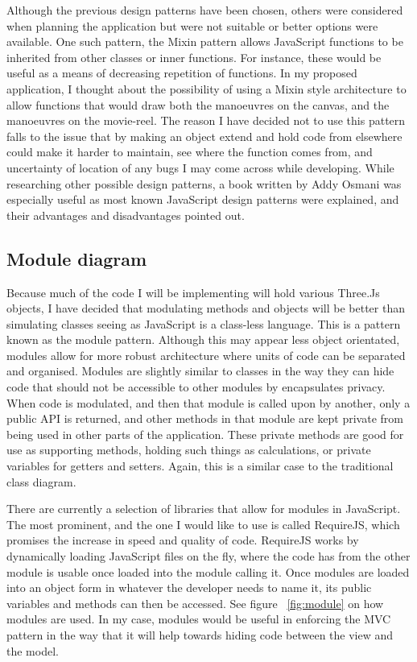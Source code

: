 Although the previous design patterns have been chosen, others were considered when planning the application but were not suitable or better options were available. One such pattern, the Mixin pattern allows JavaScript functions to be inherited from other classes or inner functions. For instance, these would be useful as a means of decreasing repetition of functions. In my proposed application, I thought about the possibility of using a Mixin style architecture to allow functions that would draw both the manoeuvres on the canvas, and the manoeuvres on the movie-reel. The reason I have decided not to use this pattern falls to the issue that by making an object extend and hold code from elsewhere could make it harder to maintain, see where the function comes from, and uncertainty of location of any bugs I may come across while developing. While researching other possible design patterns, a book written by Addy Osmani \cite{design_patterns} was especially useful as most known JavaScript design patterns were explained, and their advantages and disadvantages pointed out.

\subsection{Module diagram}
\label{sec:module}
Because much of the code I will be implementing will hold various Three.Js objects, I have decided that modulating methods and objects will be better than simulating classes seeing as JavaScript is a class-less language. This is a pattern known as the module pattern. Although this may appear less object orientated, modules allow for more robust architecture where units of code can be separated and organised. Modules are slightly similar to classes in the way they can hide code that should not be accessible to other modules by encapsulates privacy. When code is modulated, and then that module is called upon by another, only a public API is returned, and other methods in that module are kept private from being used in other parts of the application. These private methods are good for use as supporting methods, holding such things as calculations, or private variables for getters and setters. Again, this is a similar case to the traditional class diagram.

There are currently a selection of libraries that allow for modules in JavaScript. The most prominent, and the one I would like to use is called RequireJS, which promises the increase in speed and quality of code. RequireJS works by dynamically loading JavaScript files on the fly, where the code has from the other module is usable once loaded into the module calling it. Once modules are loaded into an object form in whatever the developer needs to name it, its public variables and methods can then be accessed. See figure ~\ref{fig:module} on how modules are used. In my case, modules would be useful in enforcing the MVC pattern in the way that it will help towards hiding code between the view and the model. 

